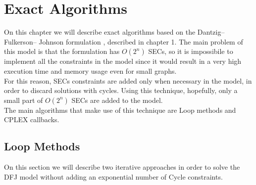 \chapter{Exact Algorithms}

On this chapter we will describe exact algorithms based on the Dantzig–Fulkerson– Johnson formulation \cite{DFJ}, described in chapter 1. The main problem of this model is that the formulation has $O(2^n)$ SECs, so it is impossibile to implement all the constraints in the model since it would result in a very high execution time and memory usage even for small graphs.
\\ For this reason, SECs constraints are added only when necessary in the model, in order to discard solutions with cycles. Using this technique, hopefully, only a small part of $O(2^n)$ SECs are added to the model.
\\ The main algorithms that make use of this technique are Loop methods and CPLEX callbacks.

\section{Loop Methods}
On this section we will describe two iterative approaches in order to solve the DFJ model without adding an exponential number of Cycle constraints.
